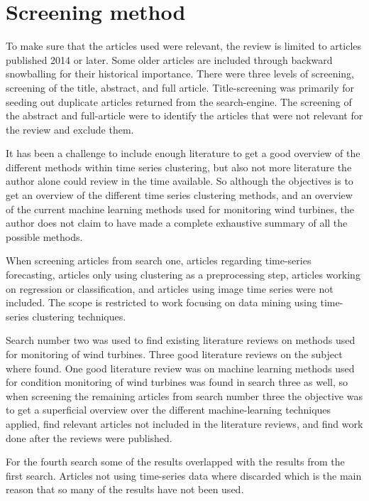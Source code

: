 \section{Screening method}
To make sure that the articles used were relevant, the review is limited to articles published 2014 or later. Some older articles are included through backward snowballing for their historical importance. There were three levels of screening, screening of the title, abstract, and full article. Title-screening was primarily for seeding out duplicate articles returned from the search-engine. The screening of the abstract and full-article were to identify the articles that were not relevant for the review and exclude them. \bigskip

It has been a challenge to include enough literature to get a good overview of the different methods within time series clustering, but also not more literature the author alone could review in the time available. So although the objectives is to get an overview of the different time series clustering methods, and an overview of the current machine learning methods used for monitoring wind turbines, the author does not claim to have made a complete exhaustive summary of all the possible methods. \bigskip

When screening articles from search one, articles regarding time-series forecasting, articles only using clustering as a preprocessing step, articles working on regression or classification, and articles using image time series were not included. The scope is restricted to work focusing on data mining using time-series clustering techniques. \bigskip

Search number two was used to find existing literature reviews on methods used for monitoring of wind turbines. Three good literature reviews on the subject where found. One good literature review was on machine learning methods used for condition monitoring of wind turbines was found in search three as well, so when screening the remaining articles from search number three the objective was to get a superficial overview over the different machine-learning techniques applied, find relevant articles not included in the literature reviews, and find work done after the reviews were published. \bigskip

For the fourth search some of the results overlapped with the results from the first search. Articles not using time-series data where discarded which is the main reason that so many of the results have not been used.